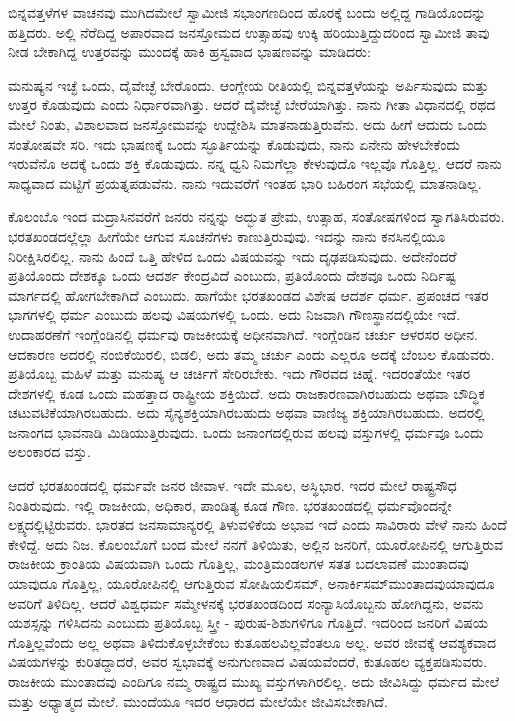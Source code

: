 ಬಿನ್ನವತ್ತಳೆಗಳ ವಾಚನವು ಮುಗಿದಮೇಲೆ ಸ್ವಾಮೀಜಿ ಸಭಾಂಗಣದಿಂದ ಹೊರಕ್ಕೆ ಬಂದು ಅಲ್ಲಿದ್ದ ಗಾಡಿಯೊಂದನ್ನು ಹತ್ತಿದರು. ಅಲ್ಲಿ ನೆರೆದಿದ್ದ ಅಪಾರವಾದ ಜನಸ್ತೋಮದ ಉತ್ಸಾಹವು ಉಕ್ಕಿ ಹರಿಯುತ್ತಿದ್ದುದರಿಂದ ಸ್ವಾಮೀಜಿ ತಾವು ನೀಡ ಬೇಕಾಗಿದ್ದ ಉತ್ತರವನ್ನು ಮುಂದಕ್ಕೆ ಹಾಕಿ ಹ್ರಸ್ವವಾದ ಭಾಷಣವನ್ನು ಮಾಡಿದರು:

ಮನುಷ್ಯನ ಇಚ್ಛೆ ಒಂದು, ದೈವೇಚ್ಛೆ ಬೇರೊಂದು. ಆಂಗ್ಲೇಯ ರೀತಿಯಲ್ಲಿ ಬಿನ್ನವತ್ತಳೆಯನ್ನು ಅರ್ಪಿಸುವುದು ಮತ್ತು ಉತ್ತರ ಕೊಡುವುದು ಎಂದು ನಿರ್ಧಾರವಾಗಿತ್ತು. ಆದರೆ ದೈವೇಚ್ಛೆ ಬೇರೆಯಾಗಿತ್ತು. ನಾನು ಗೀತಾ ವಿಧಾನದಲ್ಲಿ ರಥದ ಮೇಲೆ ನಿಂತು, ವಿಶಾಲವಾದ ಜನಸ್ತೋಮವನ್ನು ಉದ್ದೇಶಿಸಿ ಮಾತನಾಡುತ್ತಿರುವೆನು. ಅದು ಹೀಗೆ ಆದುದು ಒಂದು ಸಂತೋಷವೇ ಸರಿ. ಇದು ಭಾಷಣಕ್ಕೆ ಒಂದು ಸ್ಫೂರ್ತಿಯನ್ನು ಕೊಡುವುದು, ನಾನು ಏನೇನು ಹೇಳಬೇಕೆಂದು ಇರುವೆನೊ ಅದಕ್ಕೆ ಒಂದು ಶಕ್ತಿ ಕೊಡುವುದು. ನನ್ನ ಧ್ವನಿ ನಿಮಗೆಲ್ಲಾ ಕೇಳುವುದೊ ಇಲ್ಲವೊ ಗೊತ್ತಿಲ್ಲ. ಆದರೆ ನಾನು ಸಾಧ್ಯವಾದ ಮಟ್ಟಿಗೆ ಪ್ರಯತ್ನಪಡುವೆನು. ನಾನು ಇದುವರೆಗೆ ಇಂತಹ ಭಾರಿ ಬಹಿರಂಗ ಸಭೆಯಲ್ಲಿ ಮಾತನಾಡಿಲ್ಲ.

ಕೊಲಂಬೊ ಇಂದ ಮದ್ರಾಸಿನವರೆಗೆ ಜನರು ನನ್ನನ್ನು ಅದ್ಭುತ ಪ್ರೇಮ, ಉತ್ಸಾಹ, ಸಂತೋಷಗಳಿಂದ ಸ್ವಾಗತಿಸಿರುವರು. ಭರತಖಂಡದಲ್ಲೆಲ್ಲಾ ಹೀಗೆಯೇ ಆಗುವ ಸೂಚನೆಗಳು ಕಾಣುತ್ತಿರುವುವು. ಇದನ್ನು ನಾನು ಕನಸಿನಲ್ಲಿಯೂ ನಿರೀಕ್ಷಿಸಿರಲಿಲ್ಲ. ನಾನು ಹಿಂದೆ ಒತ್ತಿ ಹೇಳಿದ ಒಂದು ವಿಷಯವನ್ನು ಇದು ದೃಢಪಡಿಸುವುದು. ಅದೇನೆಂದರೆ ಪ್ರತಿಯೊಂದು ದೇಶಕ್ಕೂ ಒಂದು ಆದರ್ಶ ಕೇಂದ್ರವಿದೆ ಎಂಬುದು, ಪ್ರತಿಯೊಂದು ದೇಶವೂ ಒಂದು ನಿರ್ದಿಷ್ಟ ಮಾರ್ಗದಲ್ಲಿ ಹೋಗಬೇಕಾಗಿದೆ ಎಂಬುದು. ಹಾಗೆಯೇ ಭರತಖಂಡದ ವಿಶೇಷ ಆದರ್ಶ ಧರ್ಮ. ಪ್ರಪಂಚದ ಇತರ ಭಾಗಗಳಲ್ಲಿ ಧರ್ಮ ಎಂಬುದು ಹಲವು ವಿಷಯಗಳಲ್ಲಿ ಒಂದು. ಅದು ನಿಜವಾಗಿ ಗೌಣಸ್ಥಾನದಲ್ಲಿಯೇ ಇದೆ. ಉದಾಹರಣೆಗೆ ಇಂಗ್ಲೆಂಡಿನಲ್ಲಿ ಧರ್ಮವು ರಾಜಕೀಯಕ್ಕೆ ಅಧೀನವಾಗಿದೆ. ಇಂಗ್ಲೆಂಡಿನ ಚರ್ಚು ಆಳರಸರ ಅಧೀನ. ಆದಕಾರಣ ಅದರಲ್ಲಿ ನಂಬಿಕೆಯಿರಲಿ, ಬಿಡಲಿ, ಅದು ತಮ್ಮ ಚರ್ಚು ಎಂದು ಎಲ್ಲರೂ ಅದಕ್ಕೆ ಬೆಂಬಲ ಕೊಡುವರು. ಪ್ರತಿಯೊಬ್ಬ ಮಹಿಳೆ ಮತ್ತು ಮನುಷ್ಯ ಆ ಚರ್ಚಿಗೆ ಸೇರಿರಬೇಕು. ಇದು ಗೌರವದ ಚಿಹ್ನೆ. ಇದರಂತೆಯೇ ಇತರ ದೇಶಗಳಲ್ಲಿ ಕೂಡ ಒಂದು ಮಹತ್ತಾದ ರಾಷ್ಟ್ರೀಯ ಶಕ್ತಿಯಿದೆ. ಅದು ರಾಜಕಾರಣವಾಗಿರಬಹುದು ಅಥವಾ ಬೌದ್ಧಿಕ ಚಟುವಟಿಕೆಯಾಗಿರಬಹುದು. ಅದು ಸೈನ್ಯಶಕ್ತಿಯಾಗಿರಬಹುದು ಅಥವಾ ವಾಣಿಜ್ಯ ಶಕ್ತಿಯಾಗಿರಬಹುದು. ಅದರಲ್ಲಿ ಜನಾಂಗದ ಭಾವನಾಡಿ ಮಿಡಿಯುತ್ತಿರುವುದು. ಒಂದು ಜನಾಂಗದಲ್ಲಿರುವ ಹಲವು ವಸ್ತುಗಳಲ್ಲಿ ಧರ್ಮವೂ ಒಂದು ಅಲಂಕಾರದ ವಸ್ತು.

ಆದರೆ ಭರತಖಂಡದಲ್ಲಿ ಧರ್ಮವೇ ಜನರ ಜೀವಾಳ. ಇದೇ ಮೂಲ, ಅಸ್ಥಿಭಾರ. ಇದರ ಮೇಲೆ ರಾಷ್ಟ್ರಸೌಧ ನಿಂತಿರುವುದು. ಇಲ್ಲಿ ರಾಜಕೀಯ, ಅಧಿಕಾರ, ಪಾಂಡಿತ್ಯ ಕೂಡ ಗೌಣ. ಭರತಖಂಡದಲ್ಲಿ ಧರ್ಮವೊಂದನ್ನೇ ಲಕ್ಷ್ಯದಲ್ಲಿಟ್ಟಿರುವರು. ಭಾರತದ ಜನ\-ಸಾಮಾನ್ಯರಲ್ಲಿ ತಿಳುವಳಿಕೆಯ ಅಭಾವ ಇದೆ ಎಂದು ಸಾವಿರಾರು ವೇಳೆ ನಾನು ಹಿಂದೆ ಕೇಳಿದ್ದೆ. ಅದು ನಿಜ. ಕೊಲಂಬೊಗೆ ಬಂದ ಮೇಲೆ ನನಗೆ ತಿಳಿಯಿತು, ಅಲ್ಲಿನ ಜನರಿಗೆ, ಯೂರೋಪಿನಲ್ಲಿ ಆಗುತ್ತಿರುವ ರಾಜಕೀಯ ಕ್ರಾಂತಿಯ ವಿಷಯವಾಗಿ ಒಂದು ಗೊತ್ತಿಲ್ಲ, ಮಂತ್ರಿಮಂಡಲಗಳ ಸತತ ಬದಲಾವಣೆ ಮುಂತಾದವು ಯಾವುದೂ ಗೊತ್ತಿಲ್ಲ, ಯೂರೋಪಿನಲ್ಲಿ ಆಗುತ್ತಿರುವ ಸೋಷಿಯಲಿಸಮ್​, ಅನಾರ್ಕಿಸಮ್​ ಮುಂತಾದವು\break ಯಾವುದೂ ಅವರಿಗೆ ತಿಳಿದಿಲ್ಲ. ಆದರೆ ವಿಶ್ವಧರ್ಮ ಸಮ್ಮೇಳನಕ್ಕೆ ಭರತಖಂಡದಿಂದ ಸಂನ್ಯಾಸಿಯೊಬ್ಬನು ಹೋಗಿದ್ದನು, ಅವನು ಯಶಸ್ಸನ್ನು ಗಳಿಸಿದನು ಎಂಬುದು ಪ್ರತಿಯೊಬ್ಬ ಸ್ತ್ರೀ - ಪುರುಷ-ಶಿಶುಗಳಿಗೂ ಗೊತ್ತಿದೆ. ಇದರಿಂದ ಜನರಿಗೆ ವಿಷಯ ಗೊತ್ತಿಲ್ಲವೆಂದು ಅಲ್ಲ ಅಥವಾ ತಿಳಿದುಕೊಳ್ಳಬೇಕೆಂಬ ಕುತೂಹಲವಿಲ್ಲವೆಂತಲೂ ಅಲ್ಲ. ಅವರ ಜೀವಕ್ಕೆ ಆವಶ್ಯಕವಾದ ವಿಷಯಗಳನ್ನು ಕುರಿತದ್ದಾದರೆ, ಅವರ ಸ್ವಭಾವಕ್ಕೆ ಅನುಗುಣವಾದ ವಿಷಯವೆಂದರೆ, ಕುತೂಹಲ ವ್ಯಕ್ತಪಡಿಸುವರು. ರಾಜಕೀಯ ಮುಂತಾದವು ಎಂದಿಗೂ ನಮ್ಮ ರಾಷ್ಟ್ರದ ಮುಖ್ಯ ವಸ್ತುಗಳಾಗಿರಲಿಲ್ಲ. ಅದು ಜೀವಿಸಿದ್ದು ಧರ್ಮದ ಮೇಲೆ ಮತ್ತು ಅಧ್ಯಾತ್ಮದ ಮೇಲೆ. ಮುಂದೆಯೂ ಇದರ ಆಧಾರದ ಮೇಲೆಯೇ ಜೀವಿಸಬೇಕಾಗಿದೆ.

